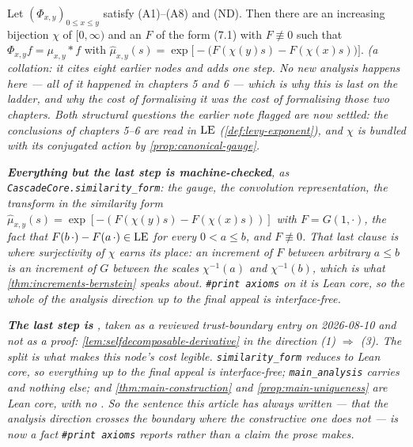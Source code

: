 \begin{theorem}\label{thm:main-analysis}
\leanok
Let $(\Phi_{x,y})_{0 \le x \le y}$ satisfy (A1)--(A8) and (ND). Then there are an increasing
bijection $\chi$ of $[0,\infty)$ and an $F$ of the form (7.1) with $F \not\equiv 0$ such that
$\Phi_{x,y} f = \mu_{x,y} * f$ with
$\hat\mu_{x,y}(s) = \exp\bigl[-\bigl(F(\chi(y)s) - F(\chi(x)s)\bigr)\bigr]$.
\statusT\quad\emph{(a collation: it cites eight earlier nodes and adds one step. No new
analysis happens here --- all of it happened in chapters 5 and 6 --- which is why this is last on
the ladder, and why the cost of formalising it was the cost of formalising those two chapters.
Both structural questions the earlier note flagged are now settled: the conclusions of chapters
5--6 are read in $\mathrm{LE}$ (\ref{def:levy-exponent}), and $\chi$ is bundled with its conjugated
action by \ref{prop:canonical-gauge}.}

\emph{\textbf{Everything but the last step is machine-checked}, as
\texttt{CascadeCore.similarity\_form}: the gauge, the convolution representation, the transform
in the similarity form $\hat\mu_{x,y}(s) = \exp[-(F(\chi(y)s) - F(\chi(x)s))]$ with
$F = G(1,\cdot)$, the fact that $F(b\,\cdot) - F(a\,\cdot) \in \mathrm{LE}$ for \emph{every}
$0 < a \le b$, and $F \not\equiv 0$. That last clause is where surjectivity of $\chi$ earns its
place: an increment of $F$ between arbitrary $a \le b$ is an increment of $G$ between the scales
$\chi^{-1}(a)$ and $\chi^{-1}(b)$, which is what \ref{thm:increments-bernstein} speaks about.
\texttt{\#print axioms} on it is Lean core, so the whole of the analysis direction up to the
final appeal is interface-free.}

\emph{\textbf{The last step is }, taken as a reviewed trust-boundary entry on
2026-08-10 and not as a proof: \ref{lem:selfdecomposable-derivative} in the direction
(1) $\Rightarrow$ (3). The split is what makes this node's cost legible.
\texttt{similarity\_form} reduces to Lean core, so everything up to the final appeal is
interface-free; \texttt{main\_analysis} carries  and nothing else; and
\ref{thm:main-construction} and \ref{prop:main-uniqueness} are Lean core, with no
. So the sentence this article has always written --- that the analysis direction
crosses the boundary where the constructive one does not --- is now a fact
\texttt{\#print axioms} reports rather than a claim the prose makes.}


\end{theorem}

